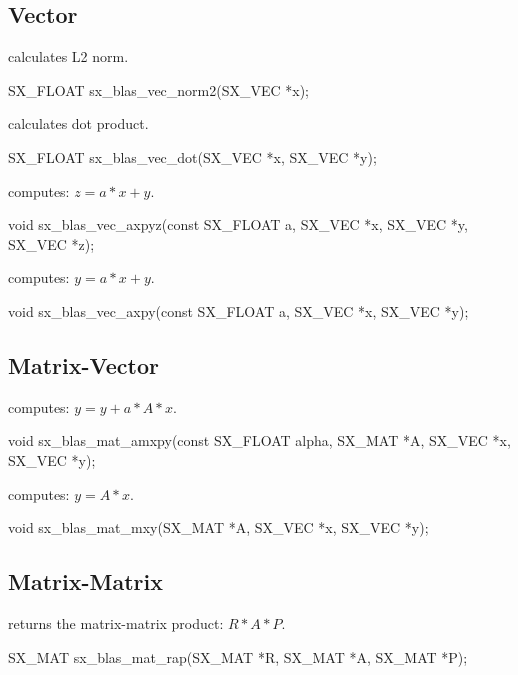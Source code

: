\subsection{Vector}
 calculates L2 norm.
\begin{evb}
SX_FLOAT sx_blas_vec_norm2(SX_VEC *x);
\end{evb}

 calculates dot product.
\begin{evb}
SX_FLOAT sx_blas_vec_dot(SX_VEC *x, SX_VEC *y);
\end{evb}

 computes: $z = a * x + y$.
\begin{evb}
void sx_blas_vec_axpyz(const SX_FLOAT a, SX_VEC *x, SX_VEC *y, SX_VEC *z);
\end{evb}

 computes: $y = a * x + y$.
\begin{evb}
void sx_blas_vec_axpy(const SX_FLOAT a, SX_VEC *x, SX_VEC *y);
\end{evb}

\subsection{Matrix-Vector}
 computes: $ y = y + a * A * x $.
\begin{evb}
void sx_blas_mat_amxpy(const SX_FLOAT alpha, SX_MAT *A, SX_VEC *x, SX_VEC *y);
\end{evb}

 computes: $y = A * x $.
\begin{evb}
void sx_blas_mat_mxy(SX_MAT *A, SX_VEC *x, SX_VEC *y);
\end{evb}

\subsection{Matrix-Matrix}
 returns the matrix-matrix product: $ R * A * P$.
\begin{evb}
SX_MAT sx_blas_mat_rap(SX_MAT *R, SX_MAT *A, SX_MAT *P);
\end{evb}
